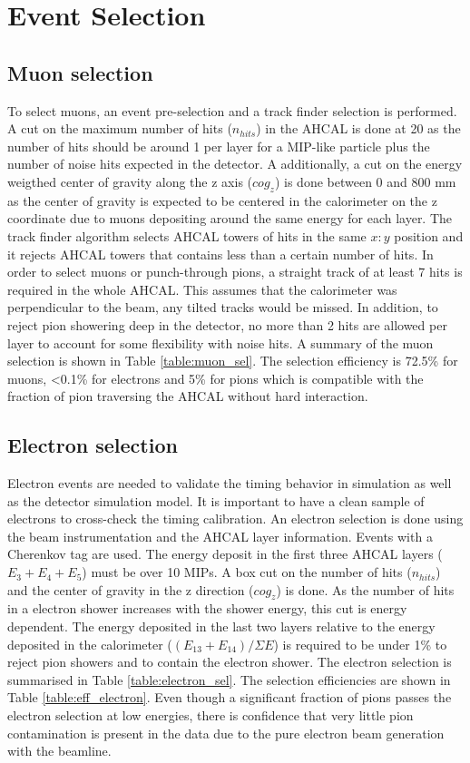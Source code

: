 \documentclass{JINST}
\begin{document}
\section{Event Selection}

\subsection{Muon selection}

To select muons, an event pre-selection and a track finder \cite{Hartbrich:2016bbz} selection is performed. A cut on the maximum number of hits ($n_{hits}$) in the AHCAL is done at 20 as the number of hits should be around 1 per layer for a MIP-like particle plus the number of noise hits expected in the detector. A additionally, a cut on the energy weigthed center of gravity along the z axis ($cog_{z}$) is done between 0 and 800 mm as the center of gravity is expected to be centered in the calorimeter on the z coordinate due to muons depositing around the same energy for each layer. The track finder algorithm selects AHCAL towers of hits in the same $x:y$ position and it rejects AHCAL towers that contains less than a certain number of hits. In order to select muons or punch-through pions, a straight track of at least 7 hits is required in the whole AHCAL. This assumes that the calorimeter was perpendicular to the beam, any tilted tracks would be missed. In addition, to reject pion showering deep in the detector, no more than 2 hits are allowed per layer to account for some flexibility with noise hits. A summary of the muon selection is shown in Table \ref{table:muon_sel}. The selection efficiency is 72.5\% for muons, <0.1\% for electrons and 5\% for pions which is compatible with the fraction of pion traversing the AHCAL without hard interaction.

\subsection{Electron selection}

Electron events are needed to validate the timing behavior in simulation as well as the detector simulation model. It is important to have a clean sample of electrons to cross-check the timing calibration. An electron selection is done using the beam instrumentation and the AHCAL layer information. Events with a Cherenkov tag are used. The energy deposit in the first three AHCAL layers ($E_3+E_4+E_5$) must be over 10 MIPs. A box cut on the number of hits ($n_{hits}$) and the center of gravity in the z direction ($cog_{z}$) is done. As the number of hits in a electron shower increases with the shower energy, this cut is energy dependent. The energy deposited in the last two layers relative to the energy deposited in the calorimeter ($(E_{13}+E_{14})/\Sigma E$) is required to be under 1\% to reject pion showers and to contain the electron shower. The electron selection is summarised in Table \ref{table:electron_sel}. The selection efficiencies are shown in Table \ref{table:eff_electron}. Even though a significant fraction of pions passes the electron selection at low energies, there is confidence that very little pion contamination is present in the data due to the pure electron beam generation with the beamline.
\end{document}
